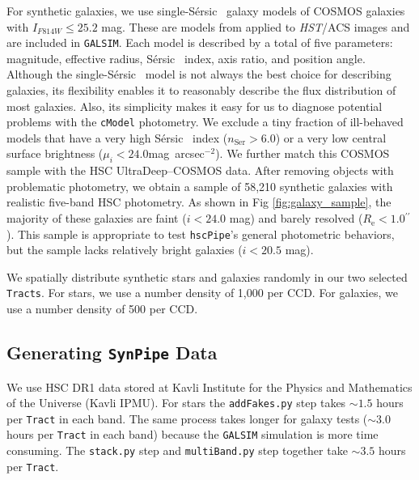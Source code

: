 \documentclass[useamsfonts]{pasj01}
\def\asec{$^{\prime\prime}$}
\def\sb{mag~arcsec$^{-2}$}
\def\ser{{S\'{e}rsic\ }}
\def\hscpipe{\texttt{hscPipe}}
\def\synpipe{\texttt{SynPipe}}
\def\cmodel{\texttt{cModel}}
\def\tract{\texttt{Tract}}
\def\tracts{\texttt{Tracts}}
\def\galsim{\texttt{G}{\scriptsize \texttt{AL}}\texttt{S}{\scriptsize \texttt{IM}}}
\begin{document}
    For synthetic galaxies, we use single-\ser{} galaxy models of COSMOS galaxies with $I_{F814W} \leq 25.2$ mag. These are models from \citet{Lackner2012} applied to \textit{HST}/ACS images and are included in \galsim{}. Each model is described by a total of five parameters: magnitude, effective radius,
    \ser{} index, axis ratio, and position angle.
    Although the single-\ser{} model is not always the best choice for describing galaxies, its flexibility
    enables it to reasonably describe the flux distribution of most galaxies.
    Also, its simplicity makes it easy for us to diagnose potential problems with the \cmodel{} photometry.
    We exclude a tiny fraction of ill-behaved models that have a very high \ser{}
    index ($n_{\mathrm{Ser}} > 6.0$) or a very low central surface brightness
    ($\mu_{i} < 24.0$\sb).
    We further match this COSMOS sample with the HSC UltraDeep--COSMOS data.
    After removing objects with problematic photometry, we obtain a sample of
    58,210 synthetic galaxies with realistic five-band HSC photometry.
    As shown in Fig \ref{fig:galaxy_sample}, the majority of these galaxies are
    faint ($i<24.0$ mag) and barely resolved ($R_{\mathrm{e}}< 1.0$\asec).
    This sample is appropriate to test \hscpipe{}'s general photometric behaviors, but
    the sample lacks relatively bright galaxies ($i<20.5$ mag).

    We spatially distribute synthetic stars and galaxies randomly in our two selected \tracts{}. For stars, we use a number density of 1,000 per CCD. For galaxies, we use a number
    density of 500 per CCD.


\subsection{Generating \synpipe{} Data}
    \label{ssec:running}

    We use HSC DR1 data stored at Kavli Institute for the Physics and Mathematics of 
    the Universe (Kavli IPMU). For stars the \texttt{addFakes.py} step takes ${\sim}1.5$ hours per \tract{} in each
    band. The same process takes longer for galaxy tests (${\sim}3.0$ hours per
    \tract{} in each band) because the \galsim{} simulation is more time consuming.
    The \texttt{stack.py} step and \texttt{multiBand.py} step together take 
    ${\sim}3.5$ hours per \tract{}.
\end{document}
